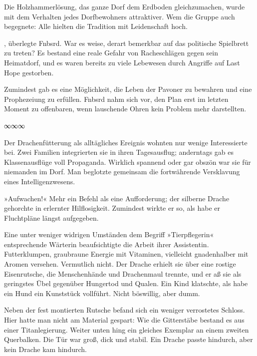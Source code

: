 
Die Holzhammerlösung, das ganze Dorf dem Erdboden gleichzumachen, wurde mit dem Verhalten jedes Dorfbewohners attraktiver. Wem die Gruppe auch begegnete: Alle hielten die Tradition mit Leidenschaft hoch.

, überlegte Fnbsrd.  War es weise, derart bemerkbar auf das politische Spielbrett zu treten? Es bestand eine reale Gefahr von Racheschlägen gegen sein Heimatdorf, und es waren bereits zu viele Lebewesen durch Angriffe auf Last Hope gestorben.

Zumindest gab es eine Möglichkeit, die Leben der Pavoner zu bewahren und eine Prophezeiung zu erfüllen. Fnbsrd nahm sich vor, den Plan erst im letzten Moment zu offenbaren, wenn lauschende Ohren kein Problem mehr darstellten.

\begin{center}
∞∞∞
\end{center}

Der Drachenfütterung als alltägliches Ereignis wohnten nur wenige Interessierte bei. Zwei Familien integrierten sie in ihren Tagesausflug; anderntags gab es Klassenausflüge voll Propaganda. Wirklich spannend oder gar obszön war sie für niemanden im Dorf. Man beglotzte gemeinsam die fortwährende Versklavung eines Intelligenzwesens.

»Aufwachen!« Mehr ein Befehl als eine Aufforderung; der silberne Drache gehorchte in erlernter Hilflosigkeit. Zumindest wirkte er so, als habe er Fluchtpläne längst aufgegeben.

Eine unter weniger widrigen Umständen dem Begriff »Tierpflegerin« entsprechende Wärterin beaufsichtigte die Arbeit ihrer Assistentin. Futterklumpen, graubraune Energie mit Vitaminen, vielleicht gnadenhalber mit Aromen versehen. Vermutlich nicht. Der Drache erhielt sie über eine rostige Eisenrutsche, die Menschenhände und Drachenmaul trennte, und er aß sie als geringstes Übel gegenüber Hungertod und Qualen. Ein Kind klatschte, als habe ein Hund ein Kunststück vollführt. Nicht böswillig, aber dumm.

Neben der fest montierten Rutsche befand sich ein weniger verrostetes Schloss. Hier hatte man nicht am Material gespart: Wie die Gitterstäbe bestand es aus einer Titanlegierung. Weiter unten hing ein gleiches Exemplar an einem zweiten Querbalken. Die Tür war groß, dick und stabil. Ein Drache passte hindurch, aber kein Drache kam hindurch.


